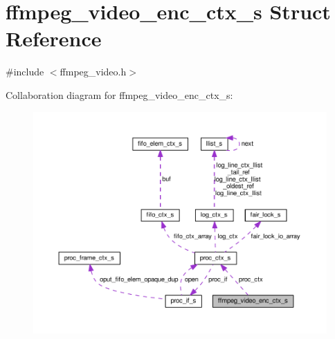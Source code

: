 \hypertarget{structffmpeg__video__enc__ctx__s}{}\section{ffmpeg\+\_\+video\+\_\+enc\+\_\+ctx\+\_\+s Struct Reference}
\label{structffmpeg__video__enc__ctx__s}


{\ttfamily \#include $<$ffmpeg\+\_\+video.\+h$>$}



Collaboration diagram for ffmpeg\+\_\+video\+\_\+enc\+\_\+ctx\+\_\+s\+:\nopagebreak
\begin{figure}[H]
\begin{center}
\leavevmode
\includegraphics[width=350pt]{structffmpeg__video__enc__ctx__s__coll__graph}
\end{center}
\end{figure}
